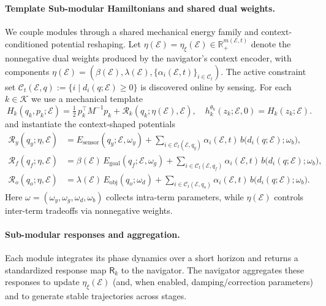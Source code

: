 \paragraph{Template {Sub-modular} Hamiltonians and shared dual weights.}
We couple modules through a shared mechanical energy family and context-conditioned potential { reshaping}.
Let $\eta(\mathcal E)=\eta_{\xi}(\mathcal E)\in\mathbb R_+^{m(\mathcal E,t)}$ denote the nonnegative dual weights produced by
the navigator's context encoder, with components
$\eta(\mathcal E)=(\beta(\mathcal E),\lambda(\mathcal E),\{\alpha_i(\mathcal E,t)\}_{i\in\mathcal C_t})$.
The active constraint set $\mathcal C_t(\mathcal E,q):=\{i\mid d_i(q;\mathcal E)\ge 0\}$ is discovered online by sensing.
For each $k\in\mathcal K$ we use a mechanical template
\begin{equation}
\label{eq:module_template_hamiltonian}
 H_k(q_k,p_k;\mathcal E)
 =\tfrac12\,p_k^\top M^{-1}p_k+\mathcal R_k(q_k;\eta(\mathcal E),\mathcal E), \quad h_k^{\theta_k}(z_k;\mathcal{E},0)=H_k(z_k;\mathcal{E}).
\end{equation}
and instantiate the context-shaped potentials
\begin{align}
\label{eq:module_potentials}
 \mathcal R_y(q_y;\eta,\mathcal E)
 &=E_{\mathrm{sensor}}(q_y;\mathcal E,\omega_y)
 +\sum_{i\in\mathcal C_t(\mathcal E,q_y)}\alpha_i(\mathcal E,t)\,b\!\big(d_i(q;\mathcal E);\omega_b\big),\\
 \mathcal R_f(q_f;\eta,\mathcal E)
 &=\beta(\mathcal E)\,E_{\mathrm{goal}}(q_f;\mathcal E,\omega_g)
 +\sum_{i\in\mathcal C_t(\mathcal E,q_f)}\alpha_i(\mathcal E,t)\,b\!\big(d_i(q;\mathcal E);\omega_b\big),\\
 \mathcal R_o(q_o;\eta,\mathcal E)
 &=\lambda(\mathcal E)\,E_{\mathrm{obj}}(q_o;\omega_d)
 +\sum_{i\in\mathcal C_t(\mathcal E,q_o)}\alpha_i(\mathcal E,t)\,b\!\big(d_i(q;\mathcal E);\omega_b\big).
 \label{eq:module_template_potential:o}
\end{align}
Here $\omega=(\omega_y,\omega_g,\omega_d,\omega_b)$ collects intra-term parameters, while $\eta(\mathcal E)$ controls
inter-term tradeoffs via nonnegative weights.

\paragraph{{Sub-modular} responses and aggregation.}
Each module integrates its phase dynamics over a short horizon and returns a standardized response map $\mathsf R_k$  to the navigator. The navigator aggregates these responses to update $\eta_{\xi}(\mathcal E)$ (and, when enabled,
damping/correction parameters) and to generate stable trajectories across stages.

